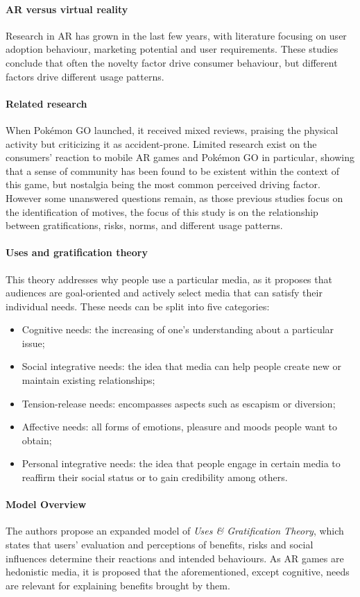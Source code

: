 \documentclass[runningheads]{llncs}
\begin{document}
\paragraph{AR versus virtual reality} Research in AR has grown in the last few years, with literature focusing on user adoption behaviour, marketing potential and user requirements. These studies conclude that often the novelty factor drive consumer behaviour, but different factors drive different usage patterns.
\paragraph{Related research} When Pokémon GO launched, it received mixed reviews, praising the physical activity but criticizing it as accident-prone. Limited research exist on the consumers' reaction to mobile AR games and Pokémon GO in particular, showing that a sense of community has been found to be existent within the context of this game, but nostalgia being the most common perceived driving factor. However some unanswered questions remain, as those previous studies focus on the identification of motives, the focus of this study is on the
relationship between gratifications, risks, norms, and different usage patterns.
\paragraph{Uses and gratification theory} This theory addresses why people use a particular media, as it proposes that audiences are goal-oriented and actively select media that can satisfy their individual needs. These needs can be split into five categories:
\begin{itemize}
    \item Cognitive needs: the increasing of one's understanding about a particular issue;
    \item Social integrative needs: the idea that media can help people create new or maintain existing relationships;
    \item Tension-release needs: encompasses aspects such as escapism or diversion;
    \item Affective needs: all forms of emotions, pleasure and moods people want to obtain;
    \item Personal integrative needs: the idea that people engage in certain media to reaffirm their social status or to gain credibility among others. 
\end{itemize}


\paragraph{Model Overview} The authors propose an expanded model of \textit{Uses \& Gratification Theory}, which states that users' evaluation and perceptions of benefits, risks and social influences determine their reactions and intended behaviours. As AR games are hedonistic media, it is proposed that the aforementioned, except cognitive, needs are relevant for explaining benefits brought by them.
\end{document}
